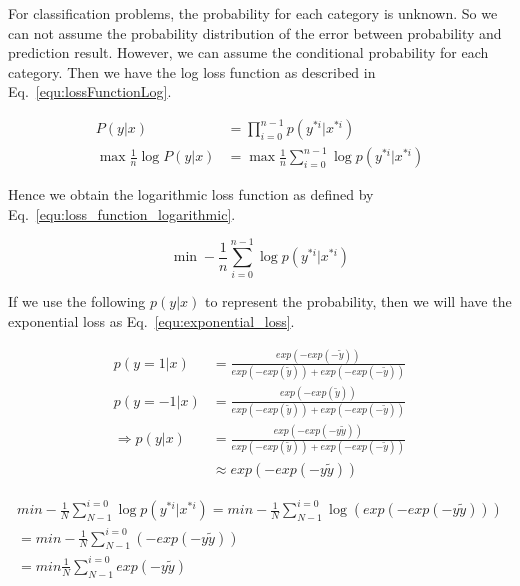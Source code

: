 \documentclass[runningheads,openany]{xhlPaper}
\begin{document}
For classification problems, the probability for each category is unknown. So we can not assume the probability distribution of the error between probability and prediction result. However, we can assume the conditional probability for each category. Then we have the log loss function as described in Eq.~\ref{equ:lossFunctionLog}.

\begin{equation}
\label{equ:lossFunctionLog}
\begin{aligned}
P\left( {y|x} \right) &= \prod\limits_{i = 0}^{n - 1} {p\left( {{y^{*i}}|{x^{*i}}} \right)} \\
\max \frac{1}{n}\log P\left( {y|x} \right) &= \max \frac{1}{n}\sum\limits_{i = 0}^{n - 1} {\log } p\left( {{y^{*i}}|{x^{*i}}} \right)
\end{aligned}
\end{equation} 

Hence we obtain the logarithmic loss function as defined by Eq.~\ref{equ:loss_function_logarithmic}.

\begin{equation}
\label{equ:loss_function_logarithmic}
\min  - \frac{1}{n}\sum\limits_{i = 0}^{n - 1} {\log p\left( {{y^{*i}}|{x^{*i}}} \right)} 
\end{equation}

If we use the following $p\left ( y|x \right )$ to represent the probability, then we will have the exponential loss as Eq.~\ref{equ:exponential_loss}.

\begin{displaymath}
\begin{aligned}
p\left ( y=1|x \right )&=\frac{exp\left ( -exp\left ( -\tilde{y} \right ) \right )}{exp\left ( -exp\left ( \tilde{y} \right ) \right ) + exp\left ( -exp\left ( -\tilde{y} \right ) \right )}\\
p\left ( y=-1|x \right )&=\frac{exp\left ( -exp\left ( \tilde{y} \right ) \right )}{exp\left ( -exp\left ( \tilde{y} \right ) \right ) + exp\left ( -exp\left ( -\tilde{y} \right ) \right )}\\
\Rightarrow p\left ( y|x \right )&=\frac{exp\left ( -exp\left ( -y\tilde{y} \right ) \right )}{exp\left ( -exp\left ( \tilde{y} \right ) \right ) + exp\left ( -exp\left ( -\tilde{y} \right ) \right )}\\
&\approx exp\left ( -exp\left ( -y\tilde{y} \right ) \right )
\end{aligned}
\end{displaymath}

\begin{equation}
\label{equ:exponential_loss}
\begin{aligned}
min -\frac{1}{N}\sum_{N-1}^{i = 0}\log p\left ( y^{*i} | x^{*i} \right )=min -\frac{1}{N}\sum_{N-1}^{i = 0}\log \left ( exp\left ( -exp\left ( -y\tilde{y} \right ) \right ) \right )\\
=min -\frac{1}{N}\sum_{N-1}^{i = 0}\left ( -exp\left ( -y\tilde{y} \right ) \right )\\
=min \frac{1}{N}\sum_{N-1}^{i = 0}exp\left ( -y\tilde{y} \right )
\end{aligned}
\end{equation}
\end{document}
